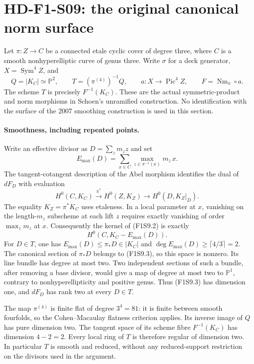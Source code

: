 
\section{HD-F1-S09: the original canonical norm surface}
\label{sec:f1-original-norm-surface}

Let $\pi:Z\to C$ be a connected etale cyclic cover of degree three,
where $C$ is a smooth nonhyperelliptic curve of genus three. Write
$\sigma$ for a deck generator, $X=\operatorname{Sym}^4 Z$, and
\[
 Q=|K_C|\simeq\mathbb P^2,\qquad
 T=(\pi^{(4)})^{-1}Q,\qquad
 a:X\longrightarrow\operatorname{Pic}^4 Z,\qquad
 F=\operatorname{Nm}_\pi\circ a.
 \tag{F1S9.1}
\]
The scheme $T$ is precisely $F^{-1}(K_C)$. These are the actual
symmetric-product and norm morphisms in Schoen's unramified construction.
No identification with the surface of the 2007 smoothing construction
is used in this section.

\paragraph{Smoothness, including repeated points.}
Write an effective divisor as $D=\sum_z m_z z$ and set
\[
 E_{\max}(D)=\sum_{x\in C}\max_{z\in\pi^{-1}(x)}m_z\,x.
\]
The tangent-cotangent description of the Abel morphism identifies the
dual of $dF_D$ with evaluation
\[
 H^0(C,K_C)\xrightarrow{\pi^*}H^0(Z,K_Z)
          \longrightarrow H^0(D,K_Z|_D).
 \tag{F1S9.2}
\]
The equality $K_Z=\pi^*K_C$ uses etaleness. In a local parameter at $x$,
vanishing on the length-$m_z$ subscheme at each lift $z$ requires exactly
vanishing of order $\max_zm_z$ at $x$. Consequently the kernel of
(F1S9.2) is exactly
\[
                         H^0(C,K_C-E_{\max}(D)).
 \tag{F1S9.3}
\]
For $D\in T$, one has $E_{\max}(D)\leq\pi_*D\in|K_C|$ and
$\deg E_{\max}(D)\geq\lceil4/3\rceil=2$. The canonical section of
$\pi_*D$ belongs to (F1S9.3), so this space is nonzero. Its line bundle
has degree at most two. Two independent sections of such a bundle,
after removing a base divisor, would give a map of degree at most two
to $\mathbb P^1$, contrary to nonhyperellipticity and positive genus.
Thus (F1S9.3) has dimension one, and $dF_D$ has rank two at every $D\in T$.

The map $\pi^{(4)}$ is finite flat of degree $3^4=81$: it is finite
between smooth fourfolds, so the Cohen--Macaulay flatness criterion
applies. Its inverse image of $Q$ has pure dimension two. The tangent
space of its scheme fibre $F^{-1}(K_C)$ has dimension $4-2=2$.
Every local ring of $T$ is therefore regular of dimension two.
In particular $T$ is smooth and reduced, without any reduced-support
restriction on the divisors used in the argument.

